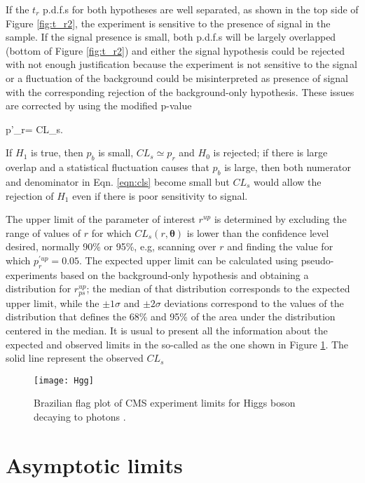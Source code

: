 If the $t_r$ p.d.f.s for both hypotheses are well separated, as shown in the top side of Figure \ref{fig:t_r2}, the experiment is sensitive to the presence of signal in the sample. If the signal presence is small, both p.d.f.s will be largely overlapped (bottom of Figure \ref{fig:t_r2}) and either the signal hypothesis could be rejected with not enough justification because the experiment is not sensitive to the signal or a fluctuation of the background could be misinterpreted as presence of signal with the corresponding rejection of the background-only hypothesis. These issues are corrected by using the modified p-value \cite{read}

\beqn
p'_r=  \equiv CL_s.\label{eqn:cls}
\eeqn

If $H_1$ is true, then $p_b$ is small, $CL_s\simeq p_r$ and $H_0$ is rejected; if there is large overlap and a statistical fluctuation causes that $p_b$ is large, then both numerator and denominator in Eqn. \ref{eqn:cls} become small but $CL_s$ would allow the rejection of $H_1$ even if there is poor sensitivity to signal.     

The upper limit of the parameter of interest $r^{up}$ is determined by excluding the range of values of $r$ for which $CL_s(r,\bm{\theta})$ is lower than the confidence level desired, normally 90\% or 95\%, e.g, scanning over $r$ and finding the value for which $p_r^{'up}=0.05$. The expected upper limit can be calculated using pseudo-experiments based on the background-only hypothesis and obtaining a distribution for $r^{up}_{ps}$; the median of that distribution corresponds to the expected upper limit, while the $\pm 1\sigma$ and $\pm2\sigma$ deviations correspond to the values of the distribution that defines the 68\% and 95\% of the area under the distribution centered in the median. It is usual to present all the information about the expected and observed limits in the so-called  as the one shown in Figure \ref{fig:hgg}. The solid line represent the observed $CL_s$  

\begin{figure}[!h]
  \centering
  \texttt{[image: Hgg]}
  \caption[Example of Brazilian flag plot]{ Brazilian flag plot of CMS experiment limits for Higgs boson decaying to photons \cite{hgg}.}\label{fig:hgg}
\end{figure}

\section{Asymptotic limits}

